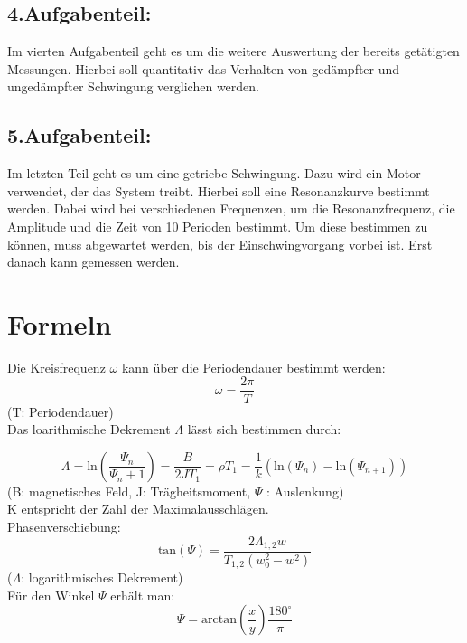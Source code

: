 \documentclass[12pt,a4paper,]{scrreprt}
\begin{document}
        
        \section{4.Aufgabenteil:}
			Im vierten Aufgabenteil geht es um die weitere Auswertung der bereits getätigten Messungen. Hierbei soll quantitativ das Verhalten von gedämpfter und ungedämpfter Schwingung verglichen werden.\\
		
        
        \section{5.Aufgabenteil:}
			Im letzten Teil geht es um eine getriebe Schwingung. Dazu wird ein Motor verwendet, der das System treibt. Hierbei soll eine Resonanzkurve bestimmt werden. Dabei wird bei verschiedenen Frequenzen, um die Resonanzfrequenz,  die Amplitude und die Zeit von 10  Perioden bestimmt. Um diese bestimmen zu können, muss abgewartet werden, bis der Einschwingvorgang vorbei ist. Erst danach kann gemessen werden. 

		\pagebreak
	
    
    
    
    
    
    
    
    
    
    
    
    
    
    
    
    \chapter{Formeln}
Die Kreisfrequenz $\omega$ kann über die Periodendauer bestimmt werden:
		\begin{equation}
			\omega = \frac{2\pi}{T}
		\end{equation}
        (T: Periodendauer) \\
	Das loarithmische Dekrement $\Lambda$ lässt sich bestimmen durch:
 
		\begin{equation}
			\Lambda = \text{ln}(\frac{\Psi_n}{\Psi_n+1}) = \frac{B}{2 J T_1} = \rho T_1 = \frac{1}{k}( \text{ln}(\Psi_n)-\text{ln}( \Psi_{n+1}))
            \label{dekrement}
		\end{equation}
        (B: magnetisches Feld, J: Trägheitsmoment, $\Psi$ : Auslenkung) \\
		K entspricht der Zahl der Maximalausschlägen.\\
		Phasenverschiebung:
		\begin{equation}
			\text{tan}(\Psi) =\frac{2 \Lambda _{1,2} w}{T_{1,2} (w_0 ^2 -w^2)}
            \label{Phase}
		\end{equation}
        ($\Lambda$: logarithmisches Dekrement) \\
        Für den Winkel $\Psi$ erhält man:
       \begin{equation}
       \Psi= \text{arctan}(\frac{x}{y}) \frac{180^\circ}{\pi}
       \label{Winkel}
       \end{equation} 
       
\end{document}
